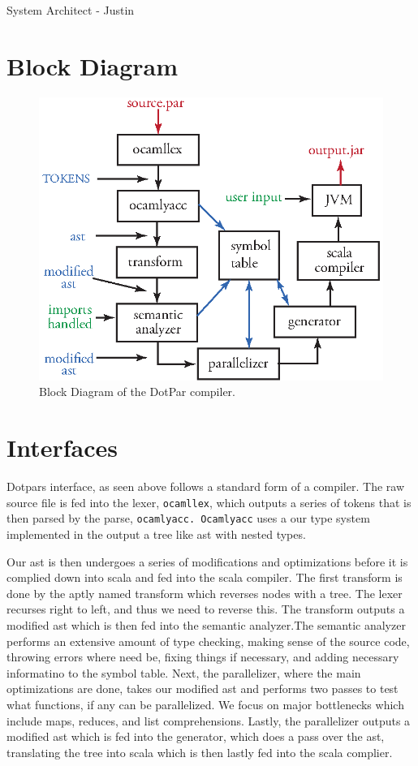 System Architect - Justin
\section{Block Diagram}
\begin{figure}[H]
\centering
\includegraphics[scale=1]{blockdiagram.eps} 
\caption{Block Diagram of the DotPar compiler.}
\end{figure}

\section{Interfaces}
Dotpars interface, as seen above follows a standard form of a compiler. The raw
source file is fed into the lexer, \verb=ocamllex=, which outputs a series of tokens that is then
parsed by the parse, \verb=ocamlyacc. Ocamlyacc= uses a our type system implemented in
the output a tree like ast with nested types. 

Our ast is then undergoes a series of modifications and optimizations before it
is complied down into scala and fed into the scala compiler.  The first transform
is done by the aptly named transform which reverses nodes with a tree.  The lexer recurses right to left, and thus we need to reverse this.  The transform outputs
a modified ast which is then fed into the semantic analyzer.The semantic analyzer 
performs an extensive amount of type checking, making sense of the source code, 
throwing errors where need be, fixing things if necessary, and adding necessary 
informatino to the symbol table.  Next, the parallelizer, where the main optimizations
are done, takes our modified ast and performs two passes to test what functions, 
if any can be parallelized. We focus on major bottlenecks which include maps, reduces,
and list comprehensions. Lastly, the parallelizer outputs a modified ast which is fed
into the generator, which does a pass over the ast, translating the tree into 
scala which is then lastly fed into the scala complier.

